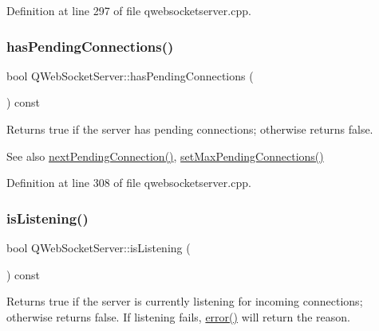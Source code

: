 Definition at line 297 of file qwebsocketserver.\+cpp.

\mbox{\label{class_q_web_socket_server_a90cd25d1e2fb4fdcc3cc7fdb4858db41}} 
\subsubsection{\texorpdfstring{has\+Pending\+Connections()}{hasPendingConnections()}}
{\footnotesize\ttfamily bool Q\+Web\+Socket\+Server\+::has\+Pending\+Connections (\begin{DoxyParamCaption}{ }\end{DoxyParamCaption}) const}

Returns true if the server has pending connections; otherwise returns false.

\begin{DoxySeeAlso}{See also}
\mbox{\hyperlink{class_q_web_socket_server_ad2463f7d2f2576268d193186ee516c94}{next\+Pending\+Connection()}}, \mbox{\hyperlink{class_q_web_socket_server_acc258d1094c0a0392c1e436bbff9c04a}{set\+Max\+Pending\+Connections()}} 
\end{DoxySeeAlso}


Definition at line 308 of file qwebsocketserver.\+cpp.

\mbox{\label{class_q_web_socket_server_a4505cb4c119bc490f8bf401998c6df43}} 
\subsubsection{\texorpdfstring{is\+Listening()}{isListening()}}
{\footnotesize\ttfamily bool Q\+Web\+Socket\+Server\+::is\+Listening (\begin{DoxyParamCaption}{ }\end{DoxyParamCaption}) const}

Returns true if the server is currently listening for incoming connections; otherwise returns false. If listening fails, \mbox{\hyperlink{class_q_web_socket_server_ad7db68dd641e6a5ff0c40b8b4788e1fc}{error()}} will return the reason.

